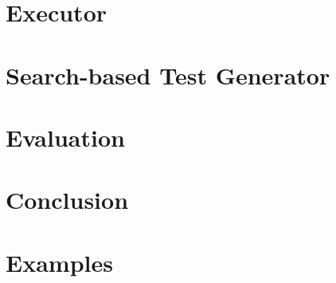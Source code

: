 \chapter{Executor}


\chapter{Search-based Test Generator}
\chapter{Evaluation}
\chapter{Conclusion}

\appendix
\chapter{Examples}
